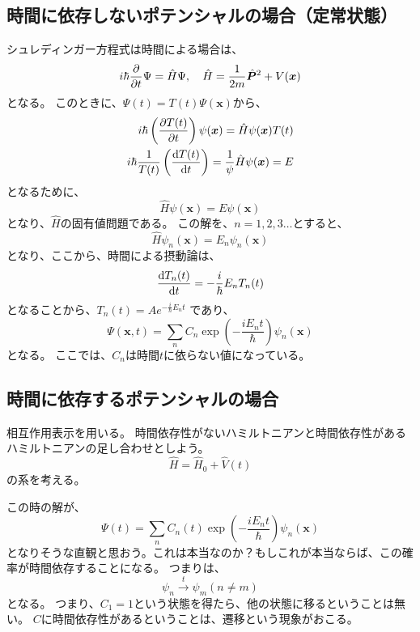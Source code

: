 \documentclass[titlepage]{ltjsarticle}
\begin{document}
\subsection{時間に依存しないポテンシャルの場合（定常状態）}
シュレディンガー方程式は時間による場合は、
\begin{equation}
  i \hbar \pdv{}{t} \Psi = \hat{H} \Psi , \quad \hat{H} = \frac{1}{2m} \hat{\bm{P}}^2 + V(\bm{x})
\end{equation}
となる。
このときに、\(\Psi(t)=T(t)\Psi(\bm{x})\)から、
\begin{align}
  i \hbar \left( \pdv{T(t)}{t} \right) \psi(\bm{x}) = \hat{H} \psi(\bm{x}) T(t)\\
  i \hbar \frac{1}{T(t)} \left( \odv{T(t)}{t} \right) = \frac{1}{\psi} \hat{H} \psi(\bm{x}) = E
\end{align}
となるために、
\begin{equation}
  \hat{H} \psi(\bm{x}) = E \psi(\bm{x})
\end{equation}
となり、\(\hat{H}\)の固有値問題である。
この解を、\(n=1,2,3\ldots\)とすると、
\begin{equation}
  \hat{H} \psi_n(\bm{x}) = E_n \psi_n(\bm{x})
\end{equation}
となり、ここから、時間による摂動論は、
\begin{equation}
  \odv{T_n(t)}{t} = - \frac{i}{\hbar} E_n T_n(t)
\end{equation}
となることから、\(T_n(t) = A e^{-\frac{i}{\hbar}E_n t}\)
であり、
\begin{equation}
  \Psi(\bm{x},t) = \sum_n C_n \exp \left( -\frac{i E_n t}{\hbar} \right) \psi_n(\bm{x})
\end{equation}
となる。
ここでは、\(C_n\)は時間\(t\)に依らない値になっている。
\subsection{時間に依存するポテンシャルの場合}
相互作用表示を用いる。
時間依存性がないハミルトニアンと時間依存性があるハミルトニアンの足し合わせとしよう。
\begin{equation}
  \hat{H} = \hat{H}_0 + \hat{V}(t)
\end{equation}
の系を考える。

この時の解が、
\begin{equation}
\Psi(t) = \sum_n C_n(t) \exp \left( -\frac{i E_n t}{\hbar} \right) \psi_n(\bm{x})
\end{equation}
となりそうな直観と思おう。これは本当なのか？もしこれが本当ならば、この確率が時間依存することになる。
つまりは、
\begin{equation}
  \psi_n \xrightarrow{t} \psi_m (n\ne m)
\end{equation}
となる。
つまり、\(C_1=1\)という状態を得たら、他の状態に移るということは無い。
\(C\)に時間依存性があるということは、遷移という現象がおこる。
\end{document}
